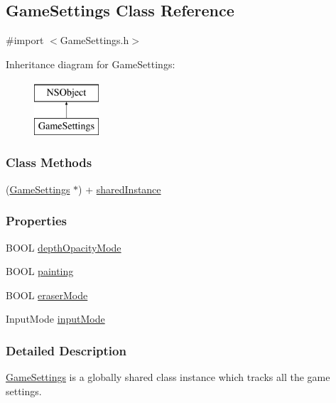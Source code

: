 \hypertarget{interface_game_settings}{\subsection{Game\-Settings Class Reference}
\label{d1/d0c/interface_game_settings}
}


{\ttfamily \#import $<$Game\-Settings.\-h$>$}

Inheritance diagram for Game\-Settings\-:\begin{figure}[H]
\begin{center}
\leavevmode
\includegraphics[height=2.000000cm]{d1/d0c/interface_game_settings}
\end{center}
\end{figure}
\subsubsection*{Class Methods}
\begin{DoxyCompactItemize}
\item 
(\hyperlink{interface_game_settings}{Game\-Settings} $\ast$) + \hyperlink{interface_game_settings_abdcc2e77ea14381a85c6de67c83df624}{shared\-Instance}
\end{DoxyCompactItemize}
\subsubsection*{Properties}
\begin{DoxyCompactItemize}
\item 
B\-O\-O\-L \hyperlink{interface_game_settings_a1ac5ddcb61e46f952ccd0e876a8578a4}{depth\-Opacity\-Mode}
\item 
B\-O\-O\-L \hyperlink{interface_game_settings_a83ea5a83eca0198be2e302aa782d8cf9}{painting}
\item 
B\-O\-O\-L \hyperlink{interface_game_settings_ab192ff4717d84e69f4e3a32a4e38d6b8}{eraser\-Mode}
\item 
Input\-Mode \hyperlink{interface_game_settings_a57e428fbdeeb3dbffa09bb7ffcf6b057}{input\-Mode}
\end{DoxyCompactItemize}


\subsubsection{Detailed Description}
\hyperlink{interface_game_settings}{Game\-Settings} is a globally shared class instance which tracks all the game settings.

